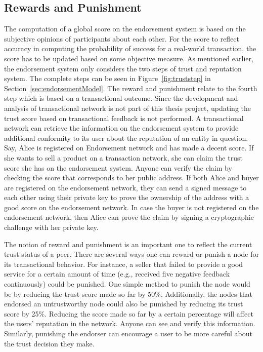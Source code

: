 \subsection{Rewards and Punishment}\label{rewardpunishment}
The computation of a global score on the endorsement system is based on the
subjective opinions of participants about each other. For the score to reflect
accuracy in computing the probability of success for a real-world transaction,
the score has to be updated based on some objective measure. As mentioned
earlier, the endorsement system only considers the two steps of trust and
reputation system. The complete steps can be seen in Figure~\ref{fig:truststep}
in Section~\ref{sec:endorsementModel}. The reward and punishment relate to the
fourth step which is based on a transactional outcome. Since the development
and analysis of transactional network is not part of this thesis project,
updating the trust score based on transactional feedback is not performed. A
transactional network can retrieve the information on the endorsement system to
provide additional conformity to its user about the reputation of an entity in
question. Say, Alice is registered on Endorsement network and has made a decent
score. If she wants to sell a product on a transaction network, she can claim
the trust score she has on the endorsement system. Anyone can verify the claim
by checking the score that corresponds to her public address. If both Alice and
buyer are registered on the endorsement network, they can send a signed message
to each other using their private key to prove the ownership of the address
with a good score on the endorsement network. In case the buyer is not
registered on the endorsement network, then Alice can prove the claim by
signing a cryptographic challenge with her private key. \par 
The notion of reward and punishment is an important one to reflect the current
trust status of a peer. There are several ways one can reward or punish a node
for its transactional behavior. For instance, a seller that failed to provide a
good service for a certain amount of time (e.g., received five negative
feedback continuously) could be punished. One simple method to punish the node
would be by reducing the trust score made so far by 50\%. Additionally, the
nodes that endorsed an untrustworthy node could also be punished by reducing
its trust score by 25\%. Reducing the score made so far by a certain percentage
will affect the users' reputation in the network. Anyone can see and verify
this information. Similarly, punishing the endorser can encourage a user to be
more careful about the trust decision they make.  


